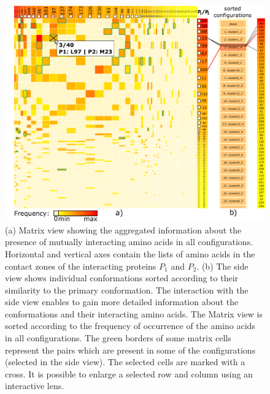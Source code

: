 \documentclass{bmcart}
\def\MatView {Matrix view\xspace}
\begin{document}
\begin{backmatter}
\begin{figure}[h!]
  \centering
  \includegraphics[width=0.9\columnwidth]{images/figure4.pdf}
  \caption{
  (a) \MatView showing the aggregated information about the presence of mutually interacting amino acids in all configurations. Horizontal and vertical axes contain the lists of amino acids in the contact zones of the interacting proteins $P_1$ and $P_2$. (b) The side view shows individual conformations sorted according to their similarity to the primary conformation. The interaction with the side view enables to gain more detailed information about the conformations and their interacting amino acids. The \MatView is sorted according to the frequency of occurrence of the amino acids in all configurations. The green borders of some matrix cells represent the pairs which are present in some of the configurations (selected in the side view). The selected cells are marked with a cross. It is possible to enlarge a selected row and column using an interactive lens.}
  \label{fig:matrixlens}
\end{figure}





\end{backmatter}
\end{document}
